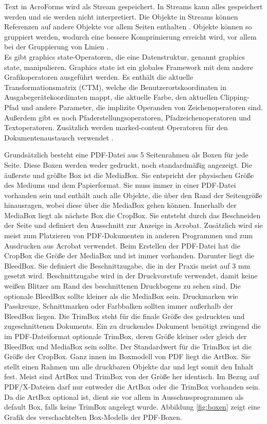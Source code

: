 Text in AcroForms wird als Stream gespeichert. In Streams kann alles gespeichert werden und sie werden nicht interpretiert. Die Objekte in Streams können Referenzen auf andere Objekte vor allem Seiten enthalten \cite{ccc-break-pdf}. Objekte können so gruppiert werden, wodurch eine bessere Komprimierung erreicht wird, vor allem bei der Gruppierung von Linien \cite{schneeberger}. \\
Es gibt graphics state-Operatoren, die eine Datenstruktur, genannt graphics state, manipulieren. Graphics state ist ein globales Framework mit dem andere Grafikoperatoren ausgeführt werden. Es enthält die aktuelle Transformationsmatrix (CTM), welche die Benutzerortskoordinaten in Ausgabegerätekoordinaten mappt, die aktuelle Farbe, den aktuellen Clipping-Pfad und andere Parameter, die implizite Operanden von Zeichenoperatoren sind. Außerdem gibt es noch Pfaderstellungsoperatoren, Pfadzeichenoperatoren und Textoperatoren. Zusätzlich werden marked-content Operatoren für den Dokumentenaustausch verwendet\cite{fileformat} . 
\par
Grundsätzlich besteht eine PDF-Datei aus 5 Seitenrahmen als Boxen für jede Seite. Diese Boxen werden weder gedruckt, noch standardmäßig angezeigt. Die äußerste und größte Box ist die MediaBox. Sie entspricht der physischen Größe des Mediums und dem Papierformat. Sie muss immer in einer PDF-Datei vorhanden sein und enthält auch alle Objekte, die über den Rand der Seitengröße hinausragen, wobei diese über die MediaBox gehen können. Innerhalb der MediaBox liegt als nächste Box die CropBox. Sie entsteht durch das Beschneiden der Seite und definiert den Ausschnitt zur Anzeige in Acrobat. Zusätzlich wird sie meist zum Platzieren von PDF-Dokumenten in anderen Programmen und zum Ausdrucken aus Acrobat verwendet. Beim Erstellen der PDF-Datei hat die CropBox die Größe der MediaBox und ist immer vorhanden. Darunter liegt die BleedBox. Sie definiert die Beschnittzugabe, die in der Praxis meist auf 3 mm gesetzt wird. Beschnittzugabe wird in der Druckvorstufe verwendet, damit keine weißen Blitzer am Rand des beschnittenen Druckbogens zu sehen sind. Die optionale BleedBox sollte kleiner als die MediaBox sein. Druckmarken wie Passkreuze, Schnittmarken oder Farbbalken sollten immer außerhalb der BleedBox liegen. Die TrimBox steht für die finale Größe des gedruckten und zugeschnittenen Dokuments. Ein zu druckendes Dokument benötigt zwingend die im PDF-Dateiformat optionale TrimBox, deren Größe kleiner oder gleich der BleedBox und MediaBox sein sollte. Der Standardwert für die TrimBox ist die Größe der CropBox. Ganz innen im Boxmodell von PDF liegt die ArtBox. Sie stellt einen Rahmen um alle druckbaren Objekte dar und legt somit den Inhalt fest. Meist sind ArtBox und TrimBox von der Größe her identisch. Im Bezug auf PDF/X-Dateien darf nur entweder die ArtBox oder die TrimBox vorhanden sein. Da die ArtBox optional ist, dient sie vor allem in Ausschussprogrammen als default Box, falls keine TrimBox angelegt wurde. Abbildung \ref{fig:boxen} zeigt eine Grafik des verschachtelten Box-Modells der PDF-Boxen.

